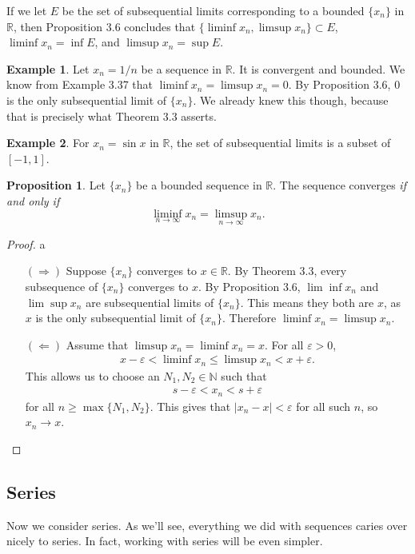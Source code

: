 \documentclass{article}
\newcommand{\N}{\mathbb{N}}
\newcommand{\R}{\mathbb{R}}
\theoremstyle{definition}
\newtheorem{proposition}{Proposition}[section]
\newtheorem{example}{Example}[section]
\begin{document}
If we let $ E $ be the set of subsequential limits corresponding to a bounded $ \{x_n\} $ in $ \R $, then Proposition 3.6 concludes that $ \{\liminf x_n,\limsup x_n\}\subset E $, $ \liminf x_n=\inf E $, and $ \limsup x_n=\sup E $. 
\begin{example}
	Let $ x_n=1/n $ be a sequence in $ \R $. It is convergent and bounded. We know from Example 3.37 that $ \liminf x_n=\limsup x_n=0 $. By Proposition 3.6, $ 0 $ is the only subsequential limit of $ \{x_n\} $. We already knew this though, because that is precisely what Theorem 3.3 asserts.
\end{example}
\begin{example}
	For $ x_n=\sin x $ in $ \R $, the set of subsequential limits is a subset of $ [-1,1] $. 
\end{example}
\begin{proposition}
	Let $ \{x_n\} $ be a bounded sequence in $ \R $. The sequence converges \textit{if and only if} $$ \liminf\limits_{n\to\infty} x_n=\limsup\limits_{n\to\infty} x_n.$$
\end{proposition}
\begin{proof}{\color{white}a}
	\begin{enumerate}
	\item [$ (\Longrightarrow) $] Suppose $ \{x_n\} $ converges to $ x\in \R $. By Theorem 3.3, every subsequence of $ \{x_n\} $ converges to $ x $. By Proposition 3.6, $ \lim\inf x_n $ and $ \lim\sup x_n $ are subsequential limits of $ \{x_n\} $. This means they both are $ x $, as $ x $ is the only subsequential limit of $ \{x_n\} $. Therefore $ \liminf x_n=\limsup x_n $.  
	\item [$ (\Longleftarrow) $] Assume that $ \limsup x_n=\liminf x_n=x $. For all $ \varepsilon>0 $, 
	\begin{align*}
		x-\varepsilon < \liminf x_n \le \limsup x_n< x+\varepsilon.
	\end{align*}
	This allows us to choose an $ N_1,N_2\in\N $ such that
	 \begin{align*}
		s-\varepsilon<x_n<s+\varepsilon
	\end{align*}
	for all $ n\ge\max\{N_1,N_2\} $. This gives that $ |x_n-x|<\varepsilon $ for all such $ n $, so $ x_n\to x $. 
\end{enumerate}
\end{proof}
\subsection{Series}
Now we consider series. As we'll see, everything we did with sequences caries over nicely to series. In fact, working with series will be even simpler.
\end{document}
